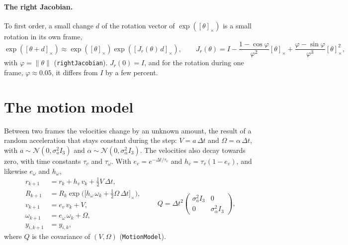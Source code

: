\documentclass[11pt]{article}
\newcommand{\dt}{\Delta t}
\begin{document}
\paragraph{The right Jacobian.}
To first order, a small change $d$ of the rotation vector of $\exp([\theta]_\times)$ is a small
rotation in its own frame,
\begin{equation}
  \exp([\theta + d]_\times) \approx \exp([\theta]_\times) \exp([J_r(\theta)\, d]_\times),
  \qquad
  J_r(\theta) = I - \frac{1 - \cos\varphi}{\varphi^2} [\theta]_\times
              + \frac{\varphi - \sin\varphi}{\varphi^3} [\theta]_\times^2,
\end{equation}
with $\varphi = \|\theta\|$ (\texttt{rightJacobian}). $J_r(0) = I$, and for the rotation during
one frame, $\varphi \approx 0.05$, it differs from $I$ by a few percent.

\section{The motion model}
\label{sec:motion}

Between two frames the velocities change by an unknown amount, the result of a random acceleration
that stays constant during the step: $V = a\, \dt$ and $\Omega = \alpha\, \dt$, with
$a \sim \mathcal{N}(0, \sigma_a^2 I_3)$ and $\alpha \sim \mathcal{N}(0, \sigma_\alpha^2 I_3)$. The
velocities also decay towards zero, with time constants $\tau_v$ and $\tau_\omega$. With
$e_v = e^{-\dt/\tau_v}$ and $h_v = \tau_v (1 - e_v)$, and likewise $e_\omega$ and $h_\omega$,
\begin{equation}
  \begin{aligned}
    r_{k+1} &= r_k + h_v\, v_k + \tfrac{1}{2} V\, \dt, \\
    R_{k+1} &= R_k \exp\big(\big[h_\omega\, \omega_k + \tfrac{1}{2} \Omega\, \dt\big]_\times\big), \\
    v_{k+1} &= e_v\, v_k + V, \\
    \omega_{k+1} &= e_\omega\, \omega_k + \Omega, \\
    y_{i,k+1} &= y_{i,k},
  \end{aligned}
  \qquad
  Q = \dt^2
  \begin{pmatrix} \sigma_a^2 I_3 & 0 \\ 0 & \sigma_\alpha^2 I_3 \end{pmatrix},
  \label{eq:motion}
\end{equation}
where $Q$ is the covariance of $(V, \Omega)$ (\texttt{MotionModel}).
\end{document}
